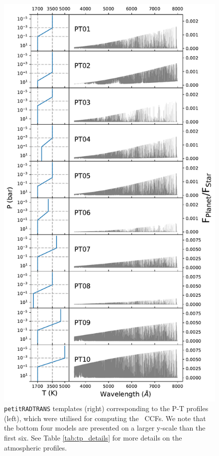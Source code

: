 \documentclass{aa}
\newcommand{\feI}{\ion{Fe}{i}}
\begin{document}
\begin{appendix}
\begin{figure}[h]
    \centering
    \includegraphics[width=0.7\hsize]{plots_submission2/PT_profiles_templates_1-10_NEWg.pdf}
    \caption{\texttt{petitRADTRANS} templates (right) corresponding to the P-T profiles (left), which were utilised for computing the \feI\ CCFs. We note that the bottom four models are presented on a larger y-scale than the first six. See Table \ref{tab:tp_details} for more details on the atmospheric profiles.}
    \label{fig:prt_models_pt_exploration}
\end{figure}



\end{appendix}
\end{document}
